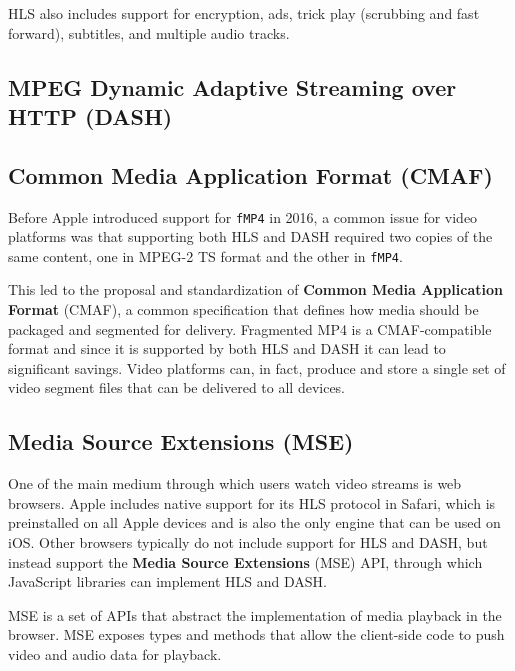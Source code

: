 HLS also includes support for encryption, ads, trick play (scrubbing and fast forward), subtitles, and multiple audio tracks.


\subsection{MPEG Dynamic Adaptive Streaming over HTTP (DASH)}
\label{sec:bg/technologies/dash}


\subsection{Common Media Application Format (CMAF)}
\label{sec:bg/technologies/cmaf}

Before Apple introduced support for \texttt{fMP4} in 2016, a common issue for video platforms was that supporting both HLS and DASH required two copies of the same content, one in MPEG-2 TS format and the other in \texttt{fMP4}.

This led to the proposal and standardization of \textbf{Common Media Application Format} (CMAF), a common specification that defines how media should be packaged and segmented for delivery. Fragmented MP4 is a CMAF-compatible format and since it is supported by both HLS and DASH it can lead to significant savings. Video platforms can, in fact, produce and store a single set of video segment files that can be delivered to all devices.\cite{cmaf}

\subsection{Media Source Extensions (MSE)}
\label{sec:bg/technologies/mse}

One of the main medium through which users watch video streams is web browsers. Apple includes native support for its HLS protocol in Safari, which is preinstalled on all Apple devices and is also the only engine that can be used on iOS. Other browsers typically do not include support for HLS and DASH, but instead support the \textbf{Media Source Extensions} (MSE) API, through which JavaScript libraries can implement HLS and DASH.\cite{mse}

MSE is a set of APIs that abstract the implementation of media playback in the browser. MSE exposes types and methods that allow the client-side code to push video and audio data for playback.

